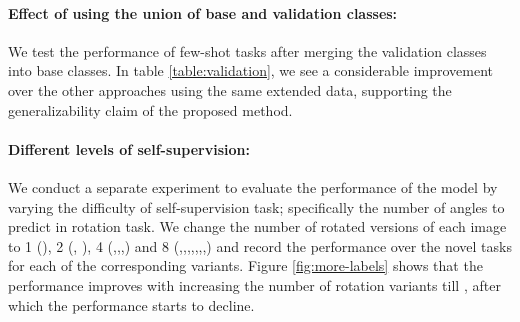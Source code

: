 \documentclass[10pt,twocolumn,letterpaper]{article}
\begin{document}
\paragraph{Effect of using the union of base and validation classes:}
We test the performance of few-shot tasks after merging the validation classes into base classes. In table \ref{table:validation}, we see a considerable improvement over the other approaches using the same extended data, supporting the generalizability claim of the proposed method.


\paragraph{Different levels of self-supervision:}
We conduct a separate experiment to evaluate the performance of the model by varying the difficulty of self-supervision task; specifically the number of angles to predict in rotation task. We change the number of rotated versions of each image to 1 (), 2 (, ), 4 (,,,) and 8 (,,,,,,,) and record the performance over the novel tasks for each of the corresponding  variants. Figure \ref{fig:more-labels} shows that the performance improves with increasing the number of rotation variants till , after which the performance starts to decline.
\end{document}

